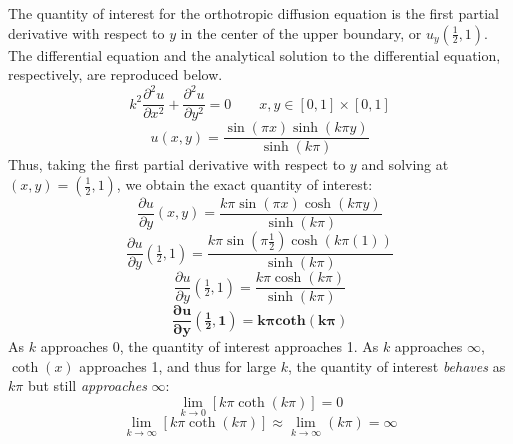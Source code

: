 \documentclass[10pt]{article}		%
\numberwithin{equation}{section}
\newcommand{\pder}[2]{\frac{\partial#1}{\partial#2}}			%
\newcommand{\psder}[2]{\dfrac{\partial^2#1}{\partial#2^2}}		%
\begin{document}
The quantity of interest for the orthotropic diffusion equation is the first partial derivative with respect to $y$ in the center of the upper boundary, or $u_y(\frac{1}{2},1)$. The differential equation and the analytical solution to the differential equation, respectively, are reproduced below.
\begin{equation}
k^2\psder{u}{x} + \psder{u}{y} = 0 \qquad x,y \in [0, 1] \times [0, 1]
\end{equation}
\begin{equation}
u(x, y) = \frac{\sin(\pi x) \sinh(k\pi y)}{\sinh(k\pi)}
\end{equation}
Thus, taking the first partial derivative with respect to $y$ and solving at $(x,y) = (\tfrac{1}{2},1)$, we obtain the exact quantity of interest:
\begin{equation}
\pder{u}{y}(x, y) = \frac{k\pi\sin(\pi x) \cosh(k\pi y)}{\sinh(k\pi)}
\end{equation}
\begin{equation}
\pder{u}{y}\left(\tfrac{1}{2},1\right) = \frac{k\pi\sin(\pi \frac{1}{2}) \cosh(k\pi (1))}{\sinh(k\pi)}
\end{equation}
\begin{equation}
\pder{u}{y}\left(\tfrac{1}{2},1\right) = \frac{k\pi\cosh(k\pi)}{\sinh(k\pi)}
\end{equation}
\begin{equation}
\mathbf{\pder{u}{y}\left(\tfrac{1}{2},1\right) = k\pi coth(k\pi)}
\end{equation}
As $k$ approaches 0, the quantity of interest approaches 1. As $k$ approaches $\infty$, $\coth(x)$ approaches 1, and thus for large $k$, the quantity of interest \textit{behaves} as $k\pi$ but still \textit{approaches} $\infty$:
\begin{equation}
\lim_{k\to 0} [k\pi \coth(k\pi)] = 0
\end{equation}
\begin{equation}
\lim_{k\to\infty} [k\pi \coth(k\pi)] \approx \lim_{k\to\infty} (k \pi) = \infty
\end{equation}
\end{document}
